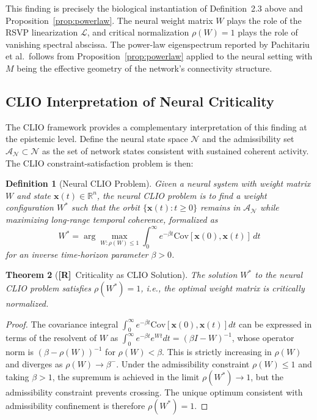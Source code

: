 \documentclass[11pt, oneside]{article}
\numberwithin{equation}{section}
\newcommand{\ClaimR}{\textcolor{rsvpblue}{\textbf{[R]}}}
\theoremstyle{rsvpstyle}
\newtheorem{theorem}{Theorem}[section]
\newtheorem{definition}[theorem]{Definition}
\theoremstyle{remark}
\newcommand{\Adm}{\mathcal{A}}
\newcommand{\Rspace}{\mathbb{R}}
\begin{document}
This finding is precisely the biological instantiation of Definition~2.3 above and
Proposition~\ref{prop:powerlaw}. The neural weight matrix $W$ plays the role of the
RSVP linearization $\mathcal{L}$, and critical normalization $\rho(W) = 1$ plays the
role of vanishing spectral abscissa. The power-law eigenspectrum reported by
Pachitariu et al.\ follows from Proposition~\ref{prop:powerlaw} applied to the neural
setting with $M$ being the effective geometry of the network's connectivity structure.

\subsection{CLIO Interpretation of Neural Criticality}

The CLIO framework provides a complementary interpretation of this finding at the
epistemic level. Define the neural state space $\mathcal{N}$ and the admissibility set
$\Adm_\mathcal{N} \subset \mathcal{N}$ as the set of network states consistent with
sustained coherent activity. The CLIO constraint-satisfaction problem is then:

\begin{definition}[Neural CLIO Problem]
Given a neural system with weight matrix $W$ and state $\mathbf{x}(t) \in \Rspace^n$,
the neural CLIO problem is to find a weight configuration $W^*$ such that the orbit
$\{\mathbf{x}(t) : t \geq 0\}$ remains in $\Adm_\mathcal{N}$ while maximizing
long-range temporal coherence, formalized as
\begin{equation}
  W^* = \arg\max_{W : \rho(W) \leq 1} \int_0^\infty e^{-\beta t}
  \mathrm{Cov}[\mathbf{x}(0), \mathbf{x}(t)] \,dt
\end{equation}
for an inverse time-horizon parameter $\beta > 0$.
\end{definition}

\begin{theorem}[\ClaimR\ Criticality as CLIO Solution]
\label{thm:clio-criticality}
The solution $W^*$ to the neural CLIO problem satisfies $\rho(W^*) = 1$, i.e., the
optimal weight matrix is critically normalized.
\end{theorem}

\begin{proof}
The covariance integral $\int_0^\infty e^{-\beta t} \mathrm{Cov}[\mathbf{x}(0), \mathbf{x}(t)] dt$
can be expressed in terms of the resolvent of $W$ as
$\int_0^\infty e^{-\beta t} e^{Wt} dt = ({\beta I - W})^{-1}$,
whose operator norm is $(β - ρ(W))^{-1}$ for $\rho(W) < \beta$. This is
strictly increasing in $\rho(W)$ and diverges as $\rho(W) \to \beta^-$. Under the
admissibility constraint $\rho(W) \leq 1$ and taking $\beta > 1$, the supremum is
achieved in the limit $\rho(W^*) \to 1$, but the admissibility constraint prevents
crossing. The unique optimum consistent with admissibility confinement is therefore
$\rho(W^*) = 1$.
\end{proof}
\end{document}
